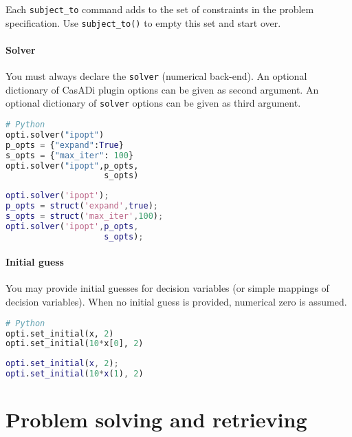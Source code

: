 \documentclass[a4paper,12pt]{book}
\newcommand{\python}[1]{\lstinline[language=Python]{#1}}
\begin{document}
Each \python{subject_to} command adds to the set of constraints in the problem specification.
Use \python{subject_to()} to empty this set and start over.

\paragraph{Solver}
You must always declare the \texttt{solver} (numerical back-end).
An optional dictionary of CasADi plugin options can be given as second argument.
An optional dictionary of \texttt{solver} options can be given as third argument.\\
\begin{minipage}[t]{0.5\textwidth}
\begin{lstlisting}[language=Python]
# Python
opti.solver("ipopt")
p_opts = {"expand":True}
s_opts = {"max_iter": 100}
opti.solver("ipopt",p_opts,
                    s_opts)
\end{lstlisting}
\end{minipage}
\begin{minipage}[t]{0.5\textwidth}
\begin{lstlisting}[language=Matlab]
% MATLAB/Octave
opti.solver('ipopt');
p_opts = struct('expand',true);
s_opts = struct('max_iter',100);
opti.solver('ipopt',p_opts,
                    s_opts);
\end{lstlisting}
\end{minipage}

\paragraph{Initial guess}
You may provide initial guesses for decision variables (or simple mappings of decision variables). When no initial guess is provided, numerical zero is assumed.
\begin{minipage}[t]{0.5\textwidth}
\begin{lstlisting}[language=Python]
# Python
opti.set_initial(x, 2)
opti.set_initial(10*x[0], 2)
\end{lstlisting}
\end{minipage}
\begin{minipage}[t]{0.5\textwidth}
\begin{lstlisting}[language=Matlab]
% MATLAB/Octave
opti.set_initial(x, 2);
opti.set_initial(10*x(1), 2)
\end{lstlisting}
\end{minipage}

\section{Problem solving and retrieving}
\end{document}

